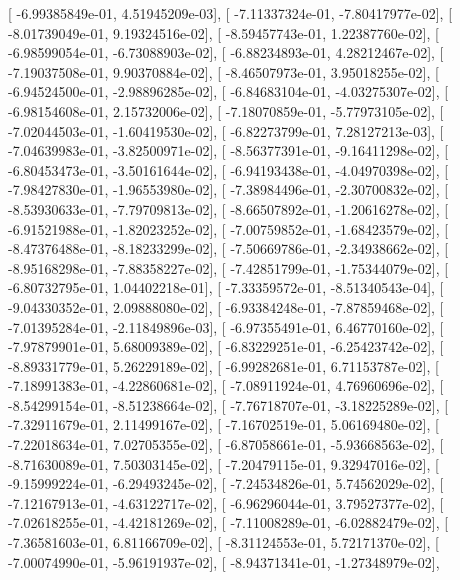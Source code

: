 \documentclass{article}
\begin{document}
       [ -6.99385849e-01,   4.51945209e-03],
       [ -7.11337324e-01,  -7.80417977e-02],
       [ -8.01739049e-01,   9.19324516e-02],
       [ -8.59457743e-01,   1.22387760e-02],
       [ -6.98599054e-01,  -6.73088903e-02],
       [ -6.88234893e-01,   4.28212467e-02],
       [ -7.19037508e-01,   9.90370884e-02],
       [ -8.46507973e-01,   3.95018255e-02],
       [ -6.94524500e-01,  -2.98896285e-02],
       [ -6.84683104e-01,  -4.03275307e-02],
       [ -6.98154608e-01,   2.15732006e-02],
       [ -7.18070859e-01,  -5.77973105e-02],
       [ -7.02044503e-01,  -1.60419530e-02],
       [ -6.82273799e-01,   7.28127213e-03],
       [ -7.04639983e-01,  -3.82500971e-02],
       [ -8.56377391e-01,  -9.16411298e-02],
       [ -6.80453473e-01,  -3.50161644e-02],
       [ -6.94193438e-01,  -4.04970398e-02],
       [ -7.98427830e-01,  -1.96553980e-02],
       [ -7.38984496e-01,  -2.30700832e-02],
       [ -8.53930633e-01,  -7.79709813e-02],
       [ -8.66507892e-01,  -1.20616278e-02],
       [ -6.91521988e-01,  -1.82023252e-02],
       [ -7.00759852e-01,  -1.68423579e-02],
       [ -8.47376488e-01,  -8.18233299e-02],
       [ -7.50669786e-01,  -2.34938662e-02],
       [ -8.95168298e-01,  -7.88358227e-02],
       [ -7.42851799e-01,  -1.75344079e-02],
       [ -6.80732795e-01,   1.04402218e-01],
       [ -7.33359572e-01,  -8.51340543e-04],
       [ -9.04330352e-01,   2.09888080e-02],
       [ -6.93384248e-01,  -7.87859468e-02],
       [ -7.01395284e-01,  -2.11849896e-03],
       [ -6.97355491e-01,   6.46770160e-02],
       [ -7.97879901e-01,   5.68009389e-02],
       [ -6.83229251e-01,  -6.25423742e-02],
       [ -8.89331779e-01,   5.26229189e-02],
       [ -6.99282681e-01,   6.71153787e-02],
       [ -7.18991383e-01,  -4.22860681e-02],
       [ -7.08911924e-01,   4.76960696e-02],
       [ -8.54299154e-01,  -8.51238664e-02],
       [ -7.76718707e-01,  -3.18225289e-02],
       [ -7.32911679e-01,   2.11499167e-02],
       [ -7.16702519e-01,   5.06169480e-02],
       [ -7.22018634e-01,   7.02705355e-02],
       [ -6.87058661e-01,  -5.93668563e-02],
       [ -8.71630089e-01,   7.50303145e-02],
       [ -7.20479115e-01,   9.32947016e-02],
       [ -9.15999224e-01,  -6.29493245e-02],
       [ -7.24534826e-01,   5.74562029e-02],
       [ -7.12167913e-01,  -4.63122717e-02],
       [ -6.96296044e-01,   3.79527377e-02],
       [ -7.02618255e-01,  -4.42181269e-02],
       [ -7.11008289e-01,  -6.02882479e-02],
       [ -7.36581603e-01,   6.81166709e-02],
       [ -8.31124553e-01,   5.72171370e-02],
       [ -7.00074990e-01,  -5.96191937e-02],
       [ -8.94371341e-01,  -1.27348979e-02],
\end{document}
